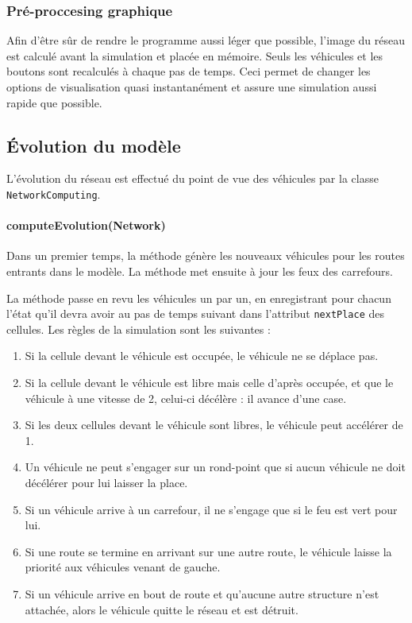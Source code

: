 \documentclass[a4paper,11pt, titlepage]{extarticle}
\begin{document}
\subsubsection{Pré-proccesing graphique}

Afin d'être sûr de rendre le programme aussi léger que possible, l'image du réseau est calculé avant la simulation et placée en mémoire. Seuls les véhicules et les boutons sont recalculés à chaque pas de temps. Ceci permet de changer les options de visualisation quasi instantanément et assure une simulation aussi rapide que possible.

\subsection{\label{sctEvolution}Évolution du modèle}

L'évolution du réseau est effectué du point de vue des véhicules par la classe \texttt{NetworkComputing}.

\paragraph{computeEvolution(Network)}

Dans un premier temps, la méthode génère les nouveaux véhicules pour les routes entrants dans le modèle. La méthode met ensuite à jour les feux des carrefours.

La méthode passe en revu les véhicules un par un, en enregistrant pour chacun l'état qu'il devra avoir au pas de temps suivant dans l'attribut \texttt{nextPlace} des cellules. Les règles de la simulation sont les suivantes :

\begin{enumerate}
\item Si la cellule devant le véhicule est occupée, le véhicule ne se déplace pas.
\item Si la cellule devant le véhicule est libre mais celle d'après occupée, et que le véhicule à une vitesse de 2, celui-ci décélère : il avance d'une case.
\item Si les deux cellules devant le véhicule sont libres, le véhicule peut accélérer de 1.
\item Un véhicule ne peut s'engager sur un rond-point que si aucun véhicule ne doit décélérer pour lui laisser la place.
\item Si un véhicule arrive à un carrefour, il ne s'engage que si le feu est vert pour lui.
\item Si une route se termine en arrivant sur une autre route, le véhicule laisse la priorité aux véhicules venant de gauche.
\item Si un véhicule arrive en bout de route et qu'aucune autre structure n'est attachée, alors le véhicule quitte le réseau et est détruit.
\end{enumerate}
\end{document}
